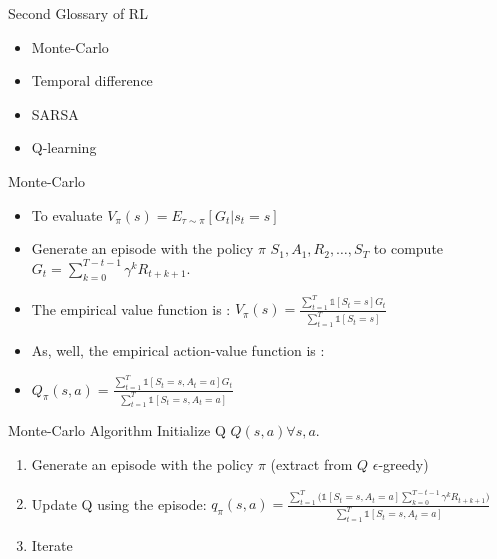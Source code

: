 \documentclass{beamer}
\begin{document}
\begin{frame}{Second Glossary of RL}
    \begin{itemize}
        \item Monte-Carlo
        \item Temporal difference
        \item SARSA
        \item Q-learning
    \end{itemize}
\end{frame}


\begin{frame}{Monte-Carlo}
\begin{itemize}
\item To evaluate
$V_\pi(s) =  E_{\tau \sim \pi}[{G_t\left| s_t = s\right.}]$
\item Generate an episode with the policy $\pi$ $S_1,A_1,R_2,…,S_T$ to compute $G_t = \sum_{k=0}^{T-t-1} \gamma^k R_{t+k+1}$.
\item The empirical value function is :
 $V_\pi(s) = \frac{\sum_{t=1}^T \mathbb{1}[S_t = s] G_t}{\sum_{t=1}^T \mathbb{1}[S_t = s]}$
 \item As, well, the empirical action-value function is :

 \item $Q_\pi(s, a) = \frac{\sum_{t=1}^T \mathbb{1}[S_t = s, A_t = a] G_t}{\sum_{t=1}^T \mathbb{1}[S_t = s, A_t = a]}$
\end{itemize}
\end{frame}

\begin{frame}{ Monte-Carlo Algorithm}
Initialize Q $Q(s,a) \forall s,a$.
\begin{enumerate}
\item Generate an episode with the policy $\pi$ (extract from $Q$ $\epsilon$-greedy)
\item Update Q using the episode: $q_\pi(s, a) = \frac{\sum_{t=1}^T \big( \mathbb{1}[S_t = s, A_t = a] \sum_{k=0}^{T-t-1} \gamma^k R_{t+k+1} \big)}{\sum_{t=1}^T \mathbb{1}[S_t = s, A_t = a]}$
\item Iterate
\end{enumerate}
\end{frame}
\end{document}
